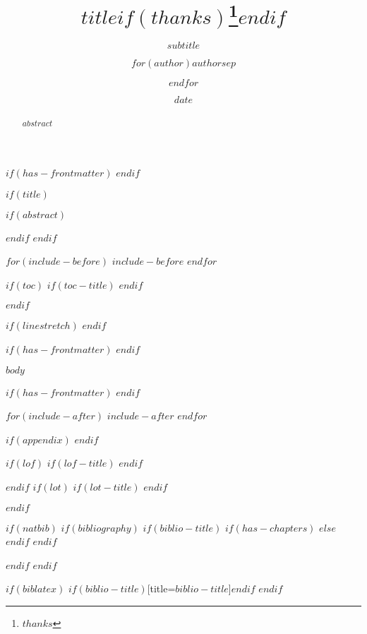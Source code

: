 \documentclass[
    $if(fontsize)$
        $fontsize$,
    $endif$
    $if(papersize)$
        $papersize$paper,
    $endif$
    $if(beamer)$
        ignorenonframetext,
    $if(handout)$
        handout,
    $endif$
    $if(aspectratio)$
        aspectratio=$aspectratio$,
    $endif$
    $endif$
    $for(classoption)$
        $classoption$$sep$,
    $endfor$
]{$documentclass$}
\title{$title$$if(thanks)$\thanks{$thanks$}$endif$}
\subtitle{$subtitle$}
\author{$for(author)$$author$$sep$ \and $endfor$}
\date{$date$}
\begin{document}
$if(has-frontmatter)$
    \frontmatter
$endif$

$if(title)$
    \maketitle

    $if(abstract)$
        \begin{abstract}
        $abstract$
        \end{abstract}
    $endif$
$endif$

$for(include-before)$
    $include-before$
$endfor$

$if(toc)$
    $if(toc-title)$
        \renewcommand*\contentsname{$toc-title$}
    $endif$

    \setcounter{tocdepth}{$toc-depth$}
    \tableofcontents
$endif$

$if(linestretch)$
$endif$

$if(has-frontmatter)$
    \mainmatter
$endif$

$body$

$if(has-frontmatter)$
    \setcounter{secnumdepth}{-\maxdimen}
    \backmatter
$endif$


$for(include-after)$
    $include-after$
$endfor$

$if(appendix)$
    \appendix
    \makeatletter
    \makeatother
$endif$

$if(lof)$
    $if(lof-title)$
        \renewcommand*\listfigurename{$lof-title$}
    $endif$
    \listoffigures
$endif$
$if(lot)$
    $if(lot-title)$
        \renewcommand*\listtablename{$lot-title$}
    $endif$
    \listoftables
$endif$

$if(natbib)$
    $if(bibliography)$
        $if(biblio-title)$
            $if(has-chapters)$
                \renewcommand\bibname{$biblio-title$}
            $else$
                \renewcommand\refname{$biblio-title$}
            $endif$
        $endif$
    
    

    $endif$
$endif$

$if(biblatex)$
    \printbibliography$if(biblio-title)$[title=$biblio-title$]$endif$
$endif$
\end{document}
